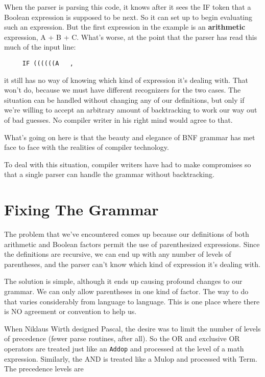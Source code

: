 When the parser is parsing this code, it knows after it  sees the IF token that a Boolean expression is supposed to be next. So it can set up to begin evaluating such an expression. But the first expression in the example is an {\bfseries arithmetic} expression, A + B + C. What's worse, at the point that the parser has read this  much of the input line:

\begin{verbatim}
     IF ((((((A   ,
\end{verbatim}

it  still has no way of knowing which  kind  of  expression  it's dealing  with. That won't do, because  we  must  have  different recognizers  for the two cases. The  situation  can  be  handled without  changing  any  of  our  definitions, but only  if  we're willing to accept an arbitrary amount of backtracking to work our way out of bad guesses. No compiler  writer  in  his  right mind would agree to that.

What's going  on  here  is  that  the  beauty and elegance of BNF grammar  has  met  face  to  face with the realities of  compiler technology.

To  deal  with  this situation, compiler writers have had to make compromises  so  that  a  single  parser can handle  the  grammar without backtracking.

\section{Fixing The Grammar}

The  problem  that  we've  encountered  comes   up   because  our definitions of both arithmetic and Boolean factors permit the use of   parenthesized  expressions. Since  the  definitions   are recursive, we  can  end  up  with  any  number   of   levels  of parentheses, and the  parser  can't know which kind of expression it's dealing with.

The  solution is simple, although it  ends  up  causing  profound changes to our  grammar. We  can only allow parentheses in one kind  of factor. The way to do  that  varies  considerably  from language  to  language. This is one  place  where  there  is  NO agreement or convention to help us.

When Niklaus Wirth designed Pascal, the desire was  to  limit the number of levels of precedence (fewer parse routines, after all). So the OR  and  exclusive  OR  operators are treated just like an {\tt Addop}  and  processed   at   the  level  of  a  math  expression. Similarly, the AND is  treated  like  a  Mulop and processed with Term. The precedence levels are

